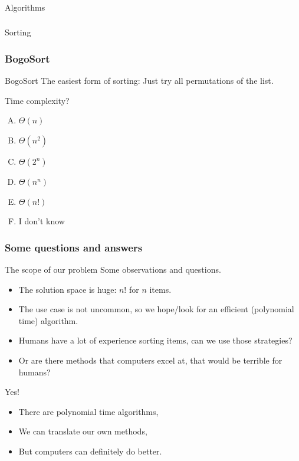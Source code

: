 \begin{frame}[fragile]\frametitle{}
\begin{center}
{\Large Algorithms}
\end{center}

\end{frame}

\begin{frame}[fragile]\frametitle{}
\begin{center}
{\Large Sorting}
\end{center}

\end{frame}


\begin{frame}
	\frametitle{BogoSort}
		\begin{block}{BogoSort}
			The easiest form of sorting: Just try all permutations of the list.
		\end{block}	
		\pause
		\begin{block}{Time complexity?}
			\begin{enumerate}[A.]
				\item $\Theta(n)$
				\item $\Theta(n^2)$
				\item $\Theta(2^n)$
				\item $\Theta(n^n)$
				\item $\Theta(n!)$
				\item I don't know
			\end{enumerate}
		\end{block}
	
\end{frame}

\begin{frame}
	\frametitle{Some questions and answers}
\begin{block}{The scope of our problem}
	Some observations and questions.
	\begin{itemize}
		\item The solution space is huge: $n!$ for $n$ items.
			\pause
		\item The use case is not uncommon, so we hope/look for an efficient (polynomial time) algorithm.
			\pause
		\item Humans have a lot of experience sorting items, can we use those strategies?
			\pause
		\item Or are there methods that computers excel at, that would be terrible for humans?
	\end{itemize}
\end{block}	
\pause
\begin{block}{Yes!}
	\begin{itemize}
		\item There are polynomial time algorithms,
			\pause
		\item We can translate our own methods,
		\item But computers can definitely do better.
	\end{itemize}
\end{block}
\end{frame}

